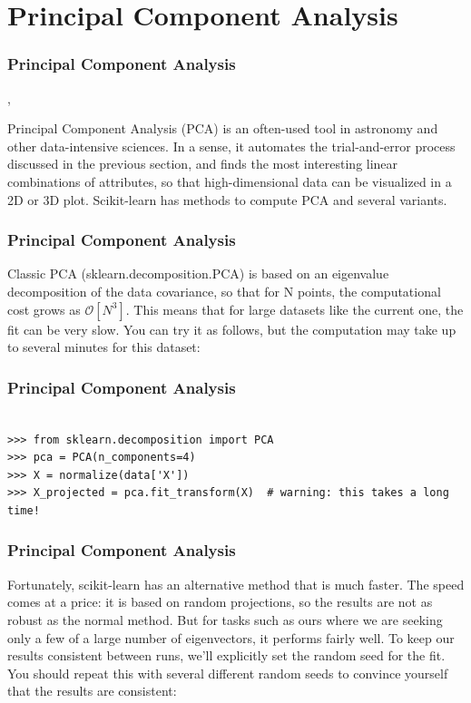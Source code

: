 \section*{Principal Component Analysis}
\begin{frame}[fragile]
\frametitle{Principal Component Analysis}
	,

Principal Component Analysis (PCA) is an often-used tool in astronomy and other data-intensive sciences. In a sense, it automates the trial-and-error process discussed in the previous section, and finds the most interesting linear combinations of attributes, so that high-dimensional data can be visualized in a 2D or 3D plot. Scikit-learn has methods to compute PCA and several variants. 
\end{frame}
\begin{frame}[fragile]
	\frametitle{Principal Component Analysis}
Classic PCA (sklearn.decomposition.PCA) is based on an eigenvalue decomposition of the data covariance, so that for N points, the computational cost grows as $\mathcal{O}[N^3]$. This means that for large datasets like the current one, the fit can be very slow. You can try it as follows, but the computation may take up to several minutes for this dataset:
\end{frame}
\begin{frame}[fragile]
	\frametitle{Principal Component Analysis}
\begin{framed}
\begin{verbatim}

>>> from sklearn.decomposition import PCA
>>> pca = PCA(n_components=4)
>>> X = normalize(data['X'])
>>> X_projected = pca.fit_transform(X)  # warning: this takes a long time!
\end{verbatim}
\end{framed}
\end{frame}
\begin{frame}[fragile]
	\frametitle{Principal Component Analysis}

Fortunately, scikit-learn has an alternative method that is much faster. The speed comes at a price: it is based on random projections, so the results are not as robust as the normal method. But for tasks such as ours where we are seeking only a few of a large number of eigenvectors, it performs fairly well. To keep our results consistent between runs, we’ll explicitly set the random seed for the fit. You should repeat this with several different random seeds to convince yourself that the results are consistent:
\end{frame}
